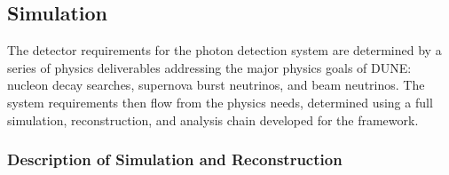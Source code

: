 %
\subsection{Simulation}
\label{sec:fdsp-pd-simphys}


The detector requirements for the photon detection system are determined by a series of physics deliverables addressing the major physics goals of DUNE: nucleon decay searches, supernova burst neutrinos, and beam neutrinos. The system requirements then flow from the physics needs, determined using a full simulation, reconstruction, and analysis chain developed for the \larsoft framework. 


\subsubsection{Description of Simulation and Reconstruction}

